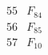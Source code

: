 \documentclass{article}
\begin{document}
{$$\begin{array}{|r|*{7}{r|}}
 & 
 & 
\\
\hline
55 
 & F_{84} &
 & 
 & 
 & 
 & 
 & 
\\
\hline
56 
 & F_{85} &
 & 
 & 
 & 
 & 
 & 
\\
\hline
57 
 & F_{10} &
 & 

\end{array}$$}
\end{document}
